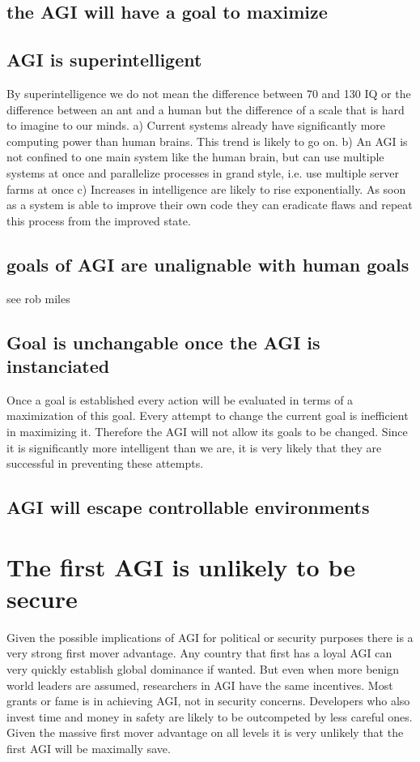\documentclass[conference]{IEEEtran}
\begin{document}
\subsection{the AGI will have a goal to maximize}

\subsection{AGI is superintelligent}

By superintelligence we do not mean the difference between 70 and 130 IQ or the difference between an ant and a human but the difference of a scale that is hard to imagine to our minds. a) Current systems already have significantly more computing power than human brains. This trend is likely to go on. b) An AGI is not confined to one main system like the human brain, but can use multiple systems at once and parallelize processes in grand style, i.e. use multiple server farms at once c) Increases in intelligence are likely to rise exponentially. As soon as a system is able to improve their own code they can eradicate flaws and repeat this process from the improved state. 

\subsection{goals of AGI are unalignable with human goals}

see rob miles


\subsection{Goal is unchangable once the AGI is instanciated} 

Once a goal is established every action will be evaluated in terms of a maximization of this goal. Every attempt to change the current goal is inefficient in maximizing it. Therefore the AGI will not allow its goals to be changed. Since it is significantly more intelligent than we are, it is very likely that they are successful in preventing these attempts. 

\subsection{AGI will escape controllable environments}

\section{The first AGI is unlikely to be secure}
%
Given the possible implications of AGI for political or security purposes there is a very strong first mover advantage. Any country that first has a loyal AGI can very quickly establish global dominance if wanted. But even when more benign world leaders are assumed, researchers in AGI have the same incentives. Most grants or fame is in achieving AGI, not in security concerns. Developers who also invest time and money in safety are likely to be outcompeted by less careful ones. Given the massive first mover advantage on all levels it is very unlikely that the first AGI will be maximally save.
 
\end{document}
